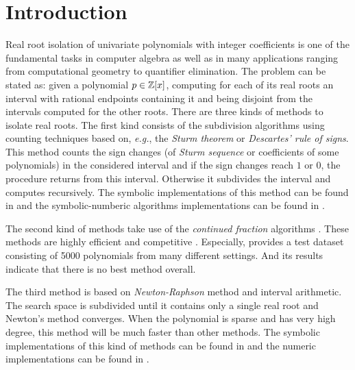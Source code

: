\section{Introduction }
\label{}
Real root isolation of univariate polynomials with integer coefficients is one of the fundamental tasks in computer algebra as well as in many applications ranging from computational geometry to quantifier elimination. The problem can be stated as: given a polynomial $p\in {\mathbb Z}[x]$, computing for each of its real roots an interval with rational endpoints containing it and being disjoint from the intervals
computed for the other roots.  There are three kinds of methods to isolate real roots.  The first kind consists of the subdivision algorithms using counting techniques based  on, {\it e.g.}, the {\em Sturm theorem} or
{\em Descartes' rule of signs}.  This  method counts the sign changes (of {\em Sturm sequence} or coefficients of some polynomials) in the considered interval and if the sign changes reach $1$ or $0$, the procedure returns from this interval.
Otherwise it subdivides the interval and computes recursively. The symbolic implementations of this method can be found in \cite{collin76,rou04,kobel2016computing,Tsigaridas2016} and the symbolic-numberic algorithms implementations can be found in \cite{rou04,eig05,eig08,meh11}.

The second kind of methods take use of the {\em continued fraction} algorithms \cite{akr08,tsi08,sha08}. These methods are highly efficient and competitive \cite{rou04,hemmer09}. Especially,  \cite{hemmer09} provides a test dataset   consisting of 5000 polynomials from many
different settings. And its   results indicate that there is no best method overall.

The third method is based on {\em Newton-Raphson} method and interval arithmetic.
The search space is subdivided until it contains only a single real root and Newton's method converges. When the polynomial is sparse and has very high degree, this method will be much faster than other methods. The symbolic implementations of this kind of methods can be found in \cite{xia06,xia07} and the numeric implementations
can be found in \cite{kla93,rump99}.

